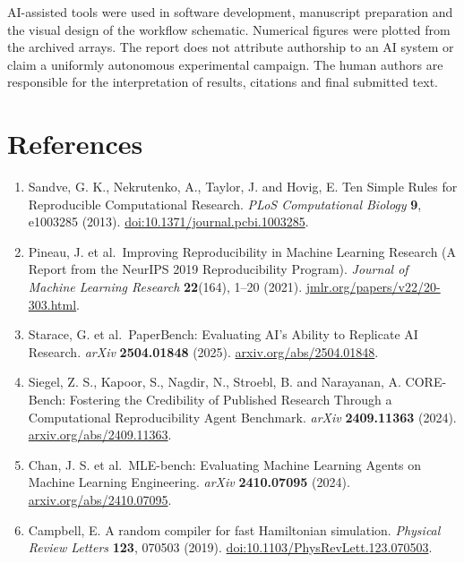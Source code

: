 \documentclass[10pt,a4paper]{article}
\begin{document}
AI-assisted tools were used in software development, manuscript
preparation and the visual design of the workflow schematic. Numerical
figures were plotted from the archived arrays. The report does not
attribute authorship to an AI system or claim a uniformly autonomous
experimental campaign. The human authors are responsible for the
interpretation of results, citations and final submitted text.

\section*{References}\label{references}

\begingroup\small

\begin{enumerate}
\def\labelenumi{\arabic{enumi}.}
\item
  Sandve, G. K., Nekrutenko, A., Taylor, J. and Hovig, E. Ten Simple
  Rules for Reproducible Computational Research. \emph{PLoS
  Computational Biology} \textbf{9}, e1003285 (2013).
  \href{https://doi.org/10.1371/journal.pcbi.1003285}{doi:10.1371/journal.pcbi.1003285}.
\item
  Pineau, J. et al.~Improving Reproducibility in Machine Learning
  Research (A Report from the NeurIPS 2019 Reproducibility Program).
  \emph{Journal of Machine Learning Research} \textbf{22}(164), 1--20
  (2021).
  \href{https://www.jmlr.org/papers/v22/20-303.html}{jmlr.org/papers/v22/20-303.html}.
\item
  Starace, G. et al.~PaperBench: Evaluating AI's Ability to Replicate AI
  Research. \emph{arXiv} \textbf{2504.01848} (2025).
  \href{https://arxiv.org/abs/2504.01848}{arxiv.org/abs/2504.01848}.
\item
  Siegel, Z. S., Kapoor, S., Nagdir, N., Stroebl, B. and Narayanan, A.
  CORE-Bench: Fostering the Credibility of Published Research Through a
  Computational Reproducibility Agent Benchmark. \emph{arXiv}
  \textbf{2409.11363} (2024).
  \href{https://arxiv.org/abs/2409.11363}{arxiv.org/abs/2409.11363}.
\item
  Chan, J. S. et al.~MLE-bench: Evaluating Machine Learning Agents on
  Machine Learning Engineering. \emph{arXiv} \textbf{2410.07095} (2024).
  \href{https://arxiv.org/abs/2410.07095}{arxiv.org/abs/2410.07095}.
\item
  Campbell, E. A random compiler for fast Hamiltonian simulation.
  \emph{Physical Review Letters} \textbf{123}, 070503 (2019).
  \href{https://doi.org/10.1103/PhysRevLett.123.070503}{doi:10.1103/PhysRevLett.123.070503}.

\end{enumerate}
\end{document}
